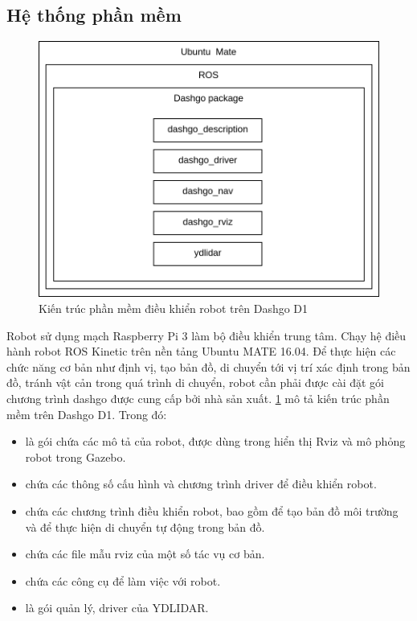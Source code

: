 \subsection{Hệ thống phần mềm} \label{sub:software-architecture}

\begin{figure}[htbp]
    \centering
    \includegraphics[width=0.7\linewidth]{figures/dashgo-architecture.png}
    \caption{Kiến trúc phần mềm điều khiển robot trên Dashgo D1}
    \label{fig:dashgo-architecture}
\end{figure}

Robot sử dụng mạch Raspberry Pi 3 làm bộ điều khiển trung tâm. Chạy hệ điều hành robot ROS Kinetic trên nền tảng Ubuntu MATE 16.04. Để thực hiện các chức năng cơ bản như định vị, tạo bản đồ, di chuyển tới vị trí xác định trong bản đồ, tránh vật cản trong quá trình di chuyển, robot cần phải được cài đặt gói chương trình dashgo được cung cấp bởi nhà sản xuất.
\figurename{ \ref{fig:dashgo-architecture}} mô tả kiến trúc phần mềm trên Dashgo D1. Trong đó:
\begin{itemize}
    \item {} là gói chứa các mô tả của robot, được dùng trong hiển thị Rviz và mô phỏng robot trong Gazebo.
    \item {} chứa các thông số cấu hình và chương trình driver để điều khiển robot.
    \item {} chứa các chương trình điều khiển robot, bao gồm  để tạo bản đồ môi trường và  để thực hiện di chuyển tự động trong bản đồ.
    \item {} chứa các file mẫu rviz của một số tác vụ cơ bản.
    \item {} chứa các công cụ để làm việc với robot.
    \item {} là gói quản lý, driver của YDLIDAR.
\end{itemize}

